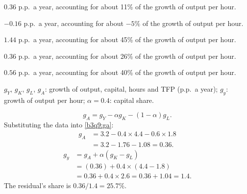 \begin{alternativas}
\item $0.36$ p.p.\ a year, accounting for about 11\% of the growth of output per hour.
\item $-0.16$ p.p.\ a year, accounting for about $-5\%$ of the growth of output per hour.
\item $1.44$ p.p.\ a year, accounting for about 45\% of the growth of output per hour.
\item $0.36$ p.p.\ a year, accounting for about 26\% of the growth of output per hour.
\item $0.56$ p.p.\ a year, accounting for about 40\% of the growth of output per hour.
\end{alternativas}
\begin{sol}
\begin{notacao}
\item $g_Y$, $g_K$, $g_L$, $g_A$: growth of output, capital, hours and TFP (p.p.\ a year); $g_y$: growth of output per hour; $\alpha=0.4$: capital share.
\end{notacao}
\begin{equation}
g_A=g_Y-\alpha g_K-(1-\alpha)g_L. \label{b3q9:ga}
\end{equation}
Substituting the data into \eqref{b3q9:ga}:
\begin{align*}
g_A&=3.2-0.4\times4.4-0.6\times1.8\\
&=3.2-1.76-1.08=0.36 .
\end{align*}
\begin{align*}
g_y&=g_A+\alpha(g_K-g_L)\\
&=(0.36)+0.4\times(4.4-1.8)\\
&=0.36+0.4\times2.6=0.36+1.04=1.4 .
\end{align*}
The residual's share is $0.36/1.4=25.7\%$.
\end{sol}
